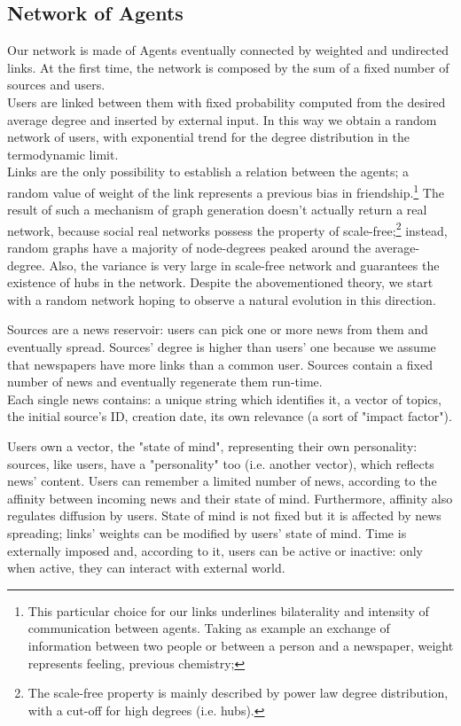 \subsection{Network of Agents}\label{subsec:network}
Our network is made of Agents eventually connected by weighted and undirected links.
At the first time, the network is composed by the sum of a fixed number of sources and users. \\
Users are linked between them with fixed probability computed from the desired average degree and inserted by external input.
 In this way we obtain a random network of users, with exponential trend for the degree distribution in the termodynamic limit.
\\ Links are the only possibility to establish a relation between the agents; a random value of weight of the link represents a previous bias in 
friendship.\footnote{This particular choice for our links underlines bilaterality and intensity of communication between agents.
Taking as example an exchange of information between two people or between a person and a newspaper, weight represents feeling, previous chemistry;}
The result of such a mechanism of graph generation doesn't actually return a real network, because social real networks possess the property of 
scale-free;\footnote{The scale-free property is mainly described by power law degree distribution, with a cut-off for high degrees (i.e. hubs). } instead, random graphs have a majority of node-degrees peaked around the average-degree. 
Also, the variance is very large in scale-free network and guarantees the existence of hubs in the network.
Despite the abovementioned theory, we start with a random network hoping to observe a natural evolution in this direction.

Sources are a news reservoir: users can pick one or more news from them and eventually spread.
Sources' degree is higher than users' one because we assume that newspapers have more links than a common user.
Sources contain a fixed number of news and eventually regenerate them run-time. \\
Each single news contains: a unique string which identifies it, a vector of topics, the initial source's ID, creation date, its own relevance (a sort of "impact factor").

Users own a vector, the "state of mind", representing their own personality: sources, like users, have a "personality" too (i.e. another vector), which reflects news' content.
Users can remember a limited number of news, according to the affinity between incoming news and their state of mind.
Furthermore, affinity also regulates diffusion by users.
State of mind is not fixed but it is affected by news spreading; links' weights can be modified by users' state of mind.
Time is externally imposed and, according to it, users can be active or inactive: only when active, they can interact with external world.

